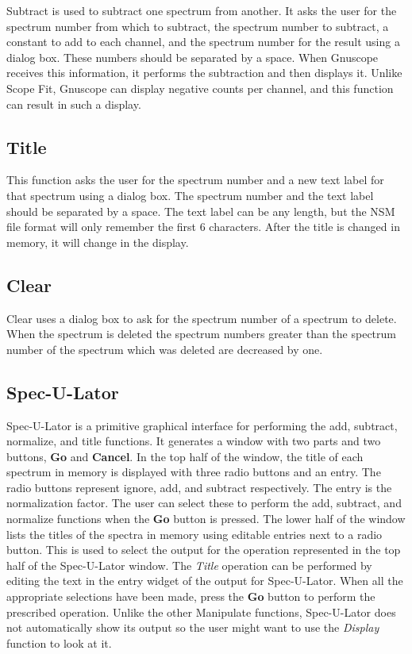 Subtract is used to subtract one spectrum from another.  It asks the user for the spectrum number from which to subtract, the spectrum number to subtract, a constant to add to each channel, and the spectrum number for the result using a dialog box.  These numbers should be separated by a space.  When Gnuscope receives this information, it performs the subtraction and then displays it.  Unlike Scope Fit, Gnuscope can display negative counts per channel, and this function can result in such a display.

\subsection{Title}

This function asks the user for the spectrum number and a new text label for that spectrum using a dialog box.  The spectrum number and the text label should be separated by a space.  The text label can be any length, but the NSM file format will only remember the first 6 characters.  After the title is changed in memory, it will change in the display.

\subsection{Clear}

Clear uses a dialog box to ask for the spectrum number of a spectrum to delete.  When the spectrum is deleted the spectrum numbers greater than the spectrum number of the spectrum which was deleted are decreased by one.

\subsection{Spec-U-Lator}

Spec-U-Lator is a primitive graphical interface for performing the add, subtract, normalize, and title functions.  It generates a window with two parts and two buttons, {\bf Go} and {\bf Cancel}.  In the top half of the window, the title of each spectrum in memory is displayed with three radio buttons and an entry.  The radio buttons represent ignore, add, and subtract respectively.  The entry is the normalization factor.  The user can select these to perform the add, subtract, and normalize functions when the {\bf Go} button is pressed.  The lower half of the window lists the titles of the spectra in memory using editable entries next to a radio button.  This is used to select the output for the operation represented in the top half of the Spec-U-Lator window.  The {\it Title} operation can be performed by editing the text in the entry widget of the output for Spec-U-Lator.  When all the appropriate selections have been made, press the {\bf Go} button to perform the prescribed operation.  Unlike the other Manipulate functions, Spec-U-Lator does not automatically show its output so the user might want to use the {\it Display} function to look at it.

